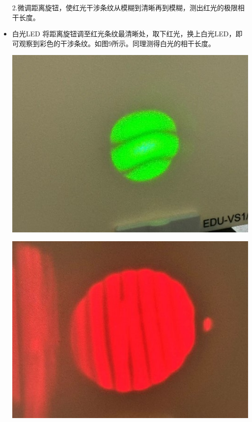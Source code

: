 \documentclass[10pt]{ctexart}
\begin{document}
\begin{itemize}
    2.微调距离旋钮，使红光干涉条纹从模糊到清晰再到模糊，测出红光的极限相干长度。
    \item 白光LED
    将距离旋钮调至红光条纹最清晰处，取下红光，换上白光LED，即可观察到彩色的干涉条纹。如图9所示。同理测得白光的相干长度。
\begin{minipage}{0.35\textwidth}
        \includegraphics[width=\textwidth]{图片2.jpg}
    \end{minipage}
    \begin{minipage}{0.35\textwidth}
        \includegraphics[width=\textwidth]{图片3.jpg}
    \end{minipage}
    \hfill
    \begin{minipage}{0.38\textwidth}

\end{minipage}
\end{itemize}
\end{document}
